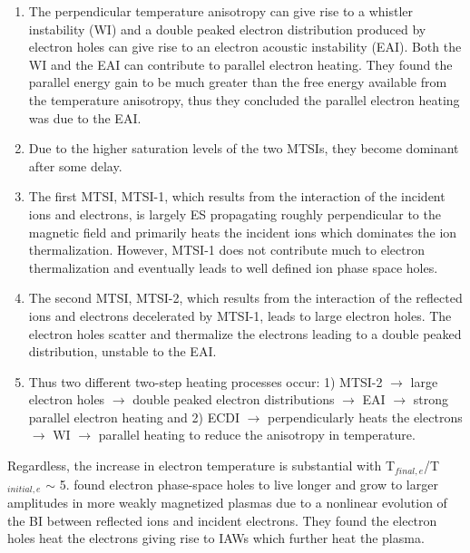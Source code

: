 \documentclass[grl]{AGUTeX}
\begin{document}
\begin{article}
\begin{enumerate}
  \item  The perpendicular temperature anisotropy can give rise to a whistler instability (WI) and a double peaked electron distribution produced by electron holes can give rise to an electron acoustic instability (EAI).  Both the WI and the EAI can contribute to parallel electron heating.  They found the parallel energy gain to be much greater than the free energy available from the temperature anisotropy, thus they concluded the parallel electron heating was due to the EAI.
  \item  Due to the higher saturation levels of the two MTSIs, they become dominant after some delay.
  \item  The first MTSI, MTSI-1, which results from the interaction of the incident ions and electrons, is largely ES propagating roughly perpendicular to the magnetic field and primarily heats the incident ions which dominates the ion thermalization.  However, MTSI-1 does not contribute much to electron thermalization and eventually leads to well defined ion phase space holes.
  \item  The second MTSI, MTSI-2, which results from the interaction of the reflected ions and electrons decelerated by MTSI-1, leads to large electron holes.  The electron holes scatter and thermalize the electrons leading to a double peaked distribution, unstable to the EAI.
  \item  Thus two different two-step heating processes occur:  1)  MTSI-2 $\rightarrow$ large electron holes $\rightarrow$ double peaked electron distributions $\rightarrow$ EAI $\rightarrow$ strong parallel electron heating and 2)  ECDI $\rightarrow$ perpendicularly heats the electrons $\rightarrow$ WI $\rightarrow$ parallel heating to reduce the anisotropy in temperature.
\end{enumerate}
Regardless, the increase in electron temperature is substantial with T${\scriptstyle_{final, e}}$/T${\scriptstyle_{initial, e}}$ $\sim$ 5.
\indent  \citet{shimada04a} found electron phase-space holes to live longer and grow to larger amplitudes in more weakly magnetized plasmas due to a nonlinear evolution of the BI between reflected ions and incident electrons.  They found the electron holes heat the electrons giving rise to IAWs which further heat the plasma.  \\

\end{article}
\end{document}

